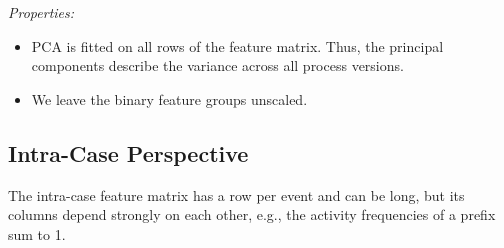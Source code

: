 \noindent\emph{Properties:}
\begin{itemize}[beginpenalty=10000]
	\item PCA is fitted on all rows of the feature matrix. Thus, the principal components describe the variance across all process versions.
	\item We leave the binary feature groups unscaled.
\end{itemize}

\subsection{Intra-Case Perspective}
\label{sec:approach:reduction:intra}
The intra-case feature matrix has a row per event and can be long, but its columns depend strongly on each other, e.g., the activity frequencies of a prefix sum to 1.

